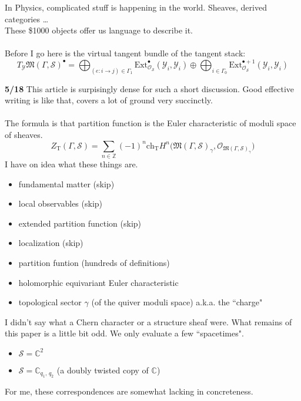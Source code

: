 \documentclass[12pt]{article}
\begin{document}
In Physics, complicated stuff is happening in the world.  Sheaves, derived categories \dots \\ These \$1000 objects offer us language to describe it.  \\ \\
Before I go here is the virtual tangent bundle of the tangent stack:
$$ T_\mathcal{Y}\mathfrak{M}(\Gamma, \mathcal{S})^\bullet = \bigoplus_{(e:i\to j)\in \Gamma_1} \text{Ext}_{\mathcal{O}_\mathcal{S}}^\bullet (\mathcal{Y}_i, \mathcal{Y}_i) \oplus \bigoplus_{i \in \Gamma_0} \text{Ext}_{\mathcal{O}_\mathcal{S}}^{\bullet + 1}(\mathcal{Y}_i, \mathcal{Y}_i) $$

\newpage

\noindent \textbf{5/18} This article is surpisingly dense for such a short discussion.  Good effective writing is like that, covers a lot of ground very succinctly. \\ \\
The formula is that partition function is the Euler characteristic of moduli space of sheaves.  
$$ Z_\text{T}(\Gamma, \mathcal{S}) = \sum_{n \in \mathbb{Z}} (-1)^n \mathrm{ch}_\text{T} H^n \big( \mathfrak{M}(\Gamma, \mathcal{S})_\gamma , \mathcal{O}_{\mathfrak{M}(\Gamma, \mathcal{S})_\gamma} \big) $$
I have on idea what these things are.
\begin{itemize}
\item fundamental matter (skip)
\item local observables (skip)
\item extended partition function (skip)
\item localization (skip)
\item partition funtion (hundreds of definitions)
\item holomorphic equivariant Euler characteristic 
\item topological sector $\gamma$ (of the quiver moduli space) a.k.a. the ``charge"
\end{itemize}
I didn't say what a Chern character or a structure sheaf were.  
What remains of this paper is a little bit odd.  We only evaluate a few ``spacetimes".  \begin{itemize}
\item $\mathcal{S} = \mathbb{C}^2$ 
\item $\mathcal{S} = \mathbb{C}_{q_1,\,q_2}$ (a doubly twisted copy of $\mathbb{C}$)
\end{itemize}
For me, these correspondences are somewhat lacking in concreteness.  \\ \\
\end{document}
